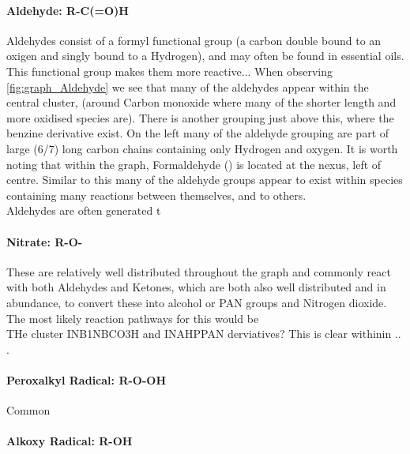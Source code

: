 \paragraph{Aldehyde: R-C(=O)H}
Aldehydes consist of a formyl functional group (a carbon double bound to an oxigen and singly bound to a Hydrogen), and may often be found in essential oils. This functional group makes them more reactive...
When observing \autoref{fig:graph_Aldehyde} we see that many of the aldehydes appear within the central cluster, (around Carbon monoxide where many of the shorter length and more oxidised species are). There is another grouping just above this, where the benzine derivative exist. On the left many of the aldehyde grouping are part of large (6/7) long carbon chains containing only Hydrogen and oxygen. It is worth noting that within the graph, Formaldehyde () is located at the nexus, left of centre. Similar to this many of the aldehyde groups appear to exist within species containing many reactions between themselves, and to others. \\





Aldehydes are often generated t



\paragraph{Nitrate: R-O-}




These are relatively well distributed throughout the graph and commonly react with both Aldehydes and Ketones, which are both also well distributed and in abundance, to convert these into alcohol or PAN groups and Nitrogen dioxide. The most likely reaction pathways for this would be \\

 THe cluster INB1NBCO3H and INAHPPAN derviatives?
This is clear withinin .. .


\paragraph{Peroxalkyl Radical: R-O-OH}
Common





\paragraph{Alkoxy Radical: R-OH }

